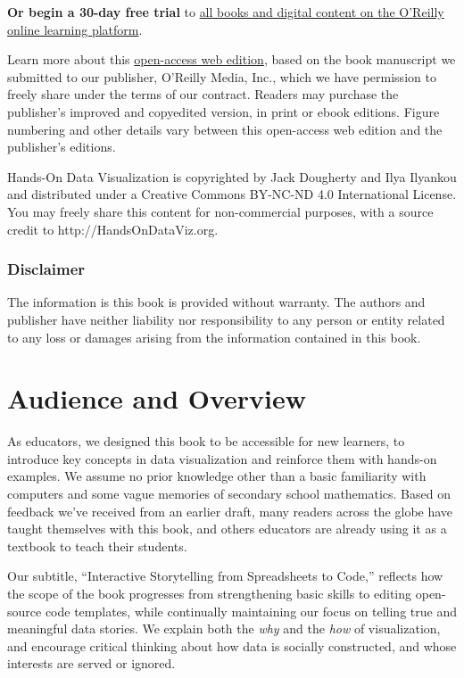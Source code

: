 \documentclass[
  english,
]{book}
\begin{document}
\textbf{Or begin a 30-day free trial} to \href{https://learning.oreilly.com/get-learning/?code=HODV21}{all books and digital content on the O'Reilly online learning platform}.

Learn more about this \href{open-access.html}{open-access web edition}, based on the book manuscript we submitted to our publisher, O'Reilly Media, Inc., which we have permission to freely share under the terms of our contract. Readers may purchase the publisher's improved and copyedited version, in print or ebook editions. Figure numbering and other details vary between this open-access web edition and the publisher's editions.

Hands-On Data Visualization is copyrighted
by Jack Dougherty and Ilya Ilyankou
and distributed under a Creative Commons BY-NC-ND 4.0 International License.
You may freely share this content for non-commercial purposes, with a source credit to http://HandsOnDataViz.org.

\hypertarget{disclaimer}{%
\subsubsection*{Disclaimer}\label{disclaimer}}

The information is this book is provided without warranty. The authors and publisher have neither liability nor responsibility to any person or entity related to any loss or damages arising from the information contained in this book.

\hypertarget{audience-overview}{%
\section*{Audience and Overview}\label{audience-overview}}

As educators, we designed this book to be accessible for new learners, to introduce key concepts in data visualization and reinforce them with hands-on examples. We assume no prior knowledge other than a basic familiarity with computers and some vague memories of secondary school mathematics. Based on feedback we've received from an earlier draft, many readers across the globe have taught themselves with this book, and others educators are already using it as a textbook to teach their students.

Our subtitle, ``Interactive Storytelling from Spreadsheets to Code,'' reflects how the scope of the book progresses from strengthening basic skills to editing open-source code templates, while continually maintaining our focus on telling true and meaningful data stories. We explain both the \emph{why} and the \emph{how} of visualization, and encourage critical thinking about how data is socially constructed, and whose interests are served or ignored.
\end{document}
